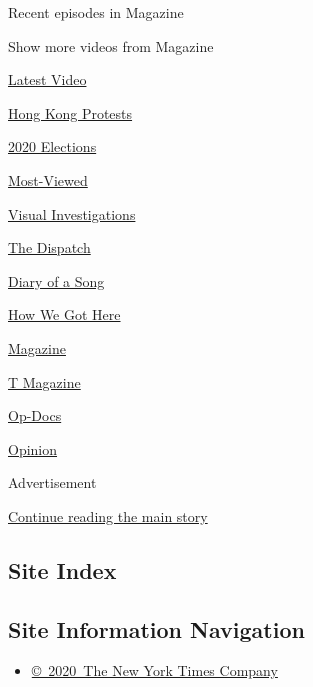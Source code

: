 Recent episodes in Magazine

Show more videos from Magazine

\href{/video}{}

\href{/video/latest-video}{Latest Video}

\href{/video/hk-protest}{Hong Kong Protests}

\href{/video/2020-Elections}{2020 Elections}

\href{/video/Most-Viewed}{Most-Viewed}

\href{/video/investigations}{Visual Investigations}

\href{/video/on-the-ground}{The Dispatch}

\href{/video/diaryofasong}{Diary of a Song}

\href{/video/how-we-got-here}{How We Got Here}

\href{/video/magazine}{Magazine}

\href{/video/t-magazine}{T Magazine}

\href{/video/op-docs}{Op-Docs}

\href{/video/opinion}{Opinion}

Advertisement

\protect\hyperlink{after-bottom}{Continue reading the main story}

\hypertarget{site-index}{%
\subsection{Site Index}\label{site-index}}

\hypertarget{site-information-navigation}{%
\subsection{Site Information
Navigation}\label{site-information-navigation}}

\begin{itemize}
\tightlist
\item
  \href{https://help.nytimes3xbfgragh.onion/hc/en-us/articles/115014792127-Copyright-notice}{©~2020~The
  New York Times Company}
\end{itemize}


